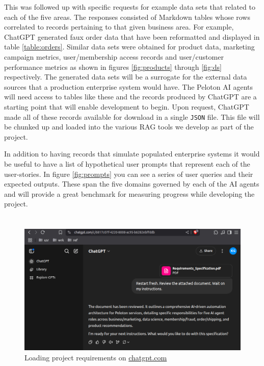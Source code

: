 \documentclass[11pt,letterpaper]{article}
\begin{document}
This was followed up with specific requests for example data sets that related to each of the five areas. The responses consisted of Markdown tables whose rows correlated to records pertaining to that given business area. For example, ChatGPT generated faux order data that have been reformatted and displayed in table \ref{table:orders}. Similar data sets were obtained for product data, marketing campaign metrics, user/membership access records and user/customer performance metrics as shown in figures \ref{fig:products} through \ref{fig:ds} respectively.
The generated data sets will be a surrogate for the external data sources that a production enterprise system would have. The Peloton AI agents will need access to tables like these and the records produced by ChatGPT are a starting point that will enable development to begin. Upon request, ChatGPT made all of these records available for download in a single \texttt{JSON} file. This file will be chunked up and loaded into the various RAG tools we develop as part of the project.

In addition to having records that simulate populated enterprise systems it would be useful to have a list of hypothetical user prompts that represent each of the user-stories. In figure \ref{fig:prompts} you can see a series of user queries and their expected outputs. These span the five domains governed by each of the AI agents and will provide a great benchmark for measuring progress while developing the project.

\pagebreak
\section*{}

\begin{figure}[h]
    \centering
      \includegraphics[width=1.0\linewidth]{chatgpt_01.png}
      \caption{Loading project requirements on \url{chatgpt.com}}
    \label{fig:load_reqs}
\end{figure}
\end{document}
